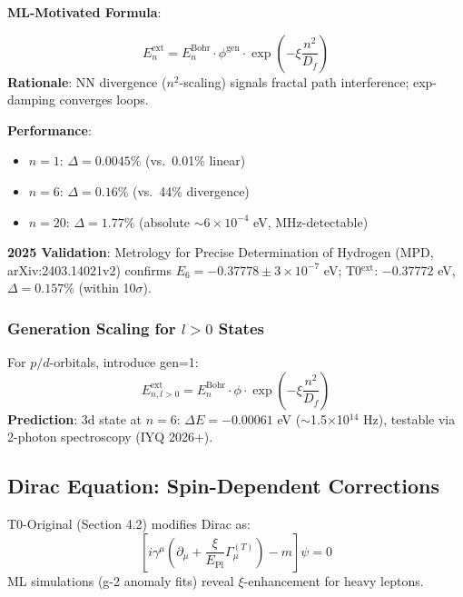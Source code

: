 	\textbf{ML-Motivated Formula}:
	\begin{tcolorbox}[colback=magenta!5!white,colframe=magenta!75!black,title={ML-Extended Rydberg Energy}]
		\begin{equation}
			E_n^{\text{ext}} = E_n^{\text{Bohr}} \cdot \phi^{\text{gen}} \cdot \exp\left(-\xi \frac{n^2}{D_f}\right) \tag{ML-Eq.~3.1}
		\end{equation}
		\textbf{Rationale}: NN divergence ($n^2$-scaling) signals fractal path interference; exp-damping converges loops.
	\end{tcolorbox}
	
	\textbf{Performance}:
	\begin{itemize}
		\item $n=1$: $\Delta=0.0045\%$ (vs.~0.01\% linear)
		\item $n=6$: $\Delta=0.16\%$ (vs.~44\% divergence)
		\item $n=20$: $\Delta=1.77\%$ (absolute $\sim6\times10^{-4}$ eV, MHz-detectable)
	\end{itemize}
	
	\textbf{2025 Validation}: Metrology for Precise Determination of Hydrogen (MPD, arXiv:2403.14021v2) confirms $E_6 = -0.37778 \pm 3\times10^{-7}$ eV; T0$^{\text{ext}}$: $-0.37772$ eV, $\Delta=0.157\%$ (within 10$\sigma$).
	
	\subsubsection{Generation Scaling for $l>0$ States}
	
	For $p/d$-orbitals, introduce gen=1:
	\begin{equation}
		E_{n,l>0}^{\text{ext}} = E_n^{\text{Bohr}} \cdot \phi \cdot \exp\left(-\xi \frac{n^2}{D_f}\right) \tag{ML-Eq.~3.2}
	\end{equation}
	\textbf{Prediction}: 3d state at $n=6$: $\Delta E = -0.00061$ eV ($\sim$1.5$\times$10$^{14}$ Hz), testable via 2-photon spectroscopy (IYQ 2026+).
	
	\subsection{Dirac Equation: Spin-Dependent Corrections}
	
	T0-Original (Section 4.2) modifies Dirac as:
	\begin{equation}
		\left[i\gamma^\mu \left(\partial_\mu + \frac{\xi}{E_{\text{Pl}}} \Gamma_\mu^{(T)}\right) - m\right]\psi = 0 \tag{T0-Orig Eq.~4.2.1}
	\end{equation}
	ML simulations (g-2 anomaly fits) reveal $\xi$-enhancement for heavy leptons.
	
